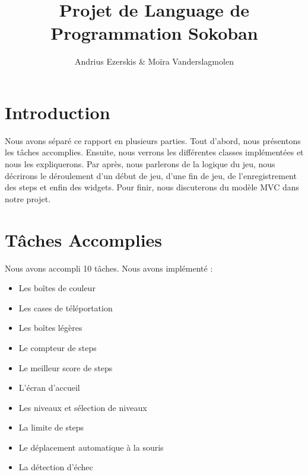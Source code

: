 \documentclass[utf8]{article}
\begin{document}
\begin{titlepage}


\author{Andrius Ezerskis \& Moïra Vanderslagmolen}
\title{Projet de Language de Programmation Sokoban}

\maketitle
\end{titlepage}
\begin{large}

\section{Introduction}
\par
\indent
Nous avons séparé ce rapport en plusieurs parties. Tout d'abord, nous présentons
les tâches accomplies. Ensuite, nous verrons les différentes classes
implémentées et nous les expliquerons. Par après, nous parlerons de la logique
du jeu, nous décrirons le déroulement d'un début de jeu, d'une fin de jeu, de
l'enregistrement des steps et enfin des widgets. Pour finir, nous discuterons du
modèle MVC dans notre projet.

\par

\section{Tâches Accomplies}

\par
\indent

Nous avons accompli 10 tâches.
Nous avons implémenté :

\begin{itemize}
    \item Les boîtes de couleur
    \item Les cases de téléportation
    \item Les boîtes légères
    \item Le compteur de steps
    \item Le meilleur score de steps
    \item L'écran d'accueil
    \item Les niveaux et sélection de niveaux 
    \item La limite de steps
    \item Le déplacement automatique à la souris
    \item La détection d'échec
  \end{itemize}


\end{large}
\end{document}

